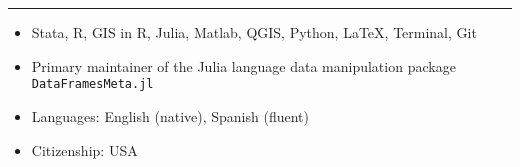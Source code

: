\documentclass[10pt]{article}
\newenvironment{customitemize}
{ \begin{itemize}[leftmargin=\parindent, topsep = 0.2pt, itemsep = -3pt] }
{\end{itemize} }
\begin{document}
\section*{}
\noindent \rule{\textwidth}{1pt} 
\begin{customitemize}
	\item Stata, R, GIS in R, Julia, Matlab, QGIS, Python, LaTeX, Terminal, Git
	\item Primary maintainer of the Julia language data manipulation package \texttt{DataFramesMeta.jl} 
	\item Languages: English (native), Spanish (fluent)
	\item Citizenship: USA
\end{customitemize}

\end{document}
